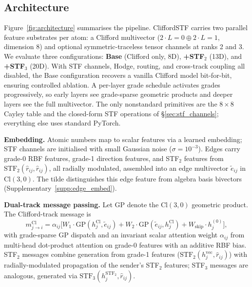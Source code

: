\subsection{Architecture}\label{sec:architecture}

Figure~\ref{fig:architecture} summarises the pipeline. CliffordSTF carries two parallel feature substrates per atom: a Clifford multivector ($2 \cdot L{=}0 \oplus 2 \cdot L{=}1$, dimension 8) and optional symmetric-traceless tensor channels at ranks 2 and 3. We evaluate three configurations: \textbf{Base} (Clifford only, 8D), \textbf{+STF$_2$} (13D), and \textbf{+STF$_3$} (20D). With STF channels, Hodge, routing, and cross-track coupling all disabled, the Base configuration recovers a vanilla Clifford model bit-for-bit, ensuring controlled ablation. A per-layer grade schedule activates grades progressively, so early layers see grade-sparse geometric products and deeper layers see the full multivector. The only nonstandard primitives are the $8 \times 8$ Cayley table and the closed-form STF operations of \S\ref{sec:stf_channels}; everything else uses standard PyTorch.

\textbf{Embedding.} Atomic numbers map to scalar features via a learned embedding; STF channels are initialised with small Gaussian noise ($\sigma{=}10^{-3}$). Edges carry grade-0 RBF features, grade-1 direction features, and STF$_2$ features from $\mathrm{STF}_2(\hat{r}_{ij}, \hat{r}_{ij})$, all radially modulated, assembled into an edge multivector $\tilde{e}_{ij}$ in $\mathrm{Cl}(3,0)$. The tilde distinguishes this edge feature from algebra basis bivectors (Supplementary~\ref{supp:edge_embed}).

\textbf{Dual-track message passing.} Let $\mathrm{GP}$ denote the $\mathrm{Cl}(3,0)$ geometric product. The Clifford-track message is
\[
m^{\mathrm{Cl}}_{j \to i} = \alpha_{ij} \bigl[W_1 \cdot \mathrm{GP}(h_j^{\mathrm{Cl}}, \tilde{e}_{ij}) + W_2 \cdot \mathrm{GP}(\tilde{e}_{ij}, h_j^{\mathrm{Cl}}) + W_{\mathrm{skip}} \cdot h_j^{(0)}\bigr],
\]
with grade-sparse GP dispatch and an invariant scalar attention weight $\alpha_{ij}$ from multi-head dot-product attention on grade-0 features with an additive RBF bias. STF$_2$ messages combine generation from grade-1 features ($\mathrm{STF}_2(h_j^{\mathrm{vec}}, \hat{r}_{ij})$) with radially-modulated propagation of the sender's STF$_2$ features; STF$_3$ messages are analogous, generated via $\mathrm{STF}_3(h_j^{\mathrm{STF}_2}, \hat{r}_{ij})$.

